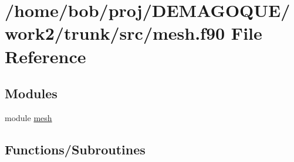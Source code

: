 \hypertarget{mesh_8f90}{
\section{/home/bob/proj/DEMAGOQUE/work2/trunk/src/mesh.f90 File Reference}
\label{mesh_8f90}
}
\subsection*{Modules}
\begin{DoxyCompactItemize}
\item 
module \hyperlink{namespacemesh}{mesh}
\end{DoxyCompactItemize}
\subsection*{Functions/Subroutines}
